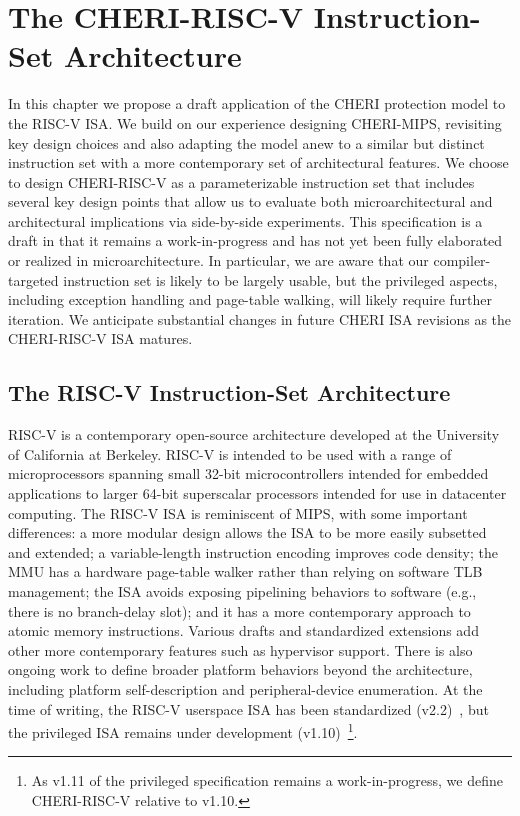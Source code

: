 \chapter{The CHERI-RISC-V Instruction-Set Architecture}
\label{chap:cheri-riscv}


\newcommand{\riscvloadcappagefault}{0x1A}
\newcommand{\riscvstorecappagefault}{0x1B}
\newcommand{\riscvcheriexception}{0x1C}

In this chapter we propose a draft application of the CHERI protection model
to the RISC-V ISA.
We build on our experience designing CHERI-MIPS, revisiting key design choices
and also adapting the model anew to a similar but distinct instruction set
with a more contemporary set of architectural features.
We choose to design CHERI-RISC-V as a parameterizable instruction set that
includes several key design points that allow us to evaluate both
microarchitectural and architectural implications via side-by-side
experiments.
This specification is a draft in that it remains a work-in-progress and has
not yet been fully elaborated or realized in microarchitecture.
In particular, we are aware that our compiler-targeted instruction set is
likely to be largely usable, but the privileged aspects, including exception
handling and page-table walking, will likely require further iteration.
We anticipate substantial changes in future CHERI ISA revisions as the
CHERI-RISC-V ISA matures.

\section{The RISC-V Instruction-Set Architecture}

RISC-V is a contemporary open-source architecture developed at the University
of California at Berkeley.
RISC-V is intended to be used with a range of microprocessors spanning small
32-bit microcontrollers intended for embedded applications to larger 64-bit
superscalar processors intended for use in datacenter computing.
The RISC-V ISA is reminiscent of MIPS, with some important differences: a more
modular design allows the ISA to be more easily subsetted and extended; a
variable-length instruction encoding improves code density; the MMU has a
hardware page-table walker rather than relying on software TLB management;
the ISA avoids exposing pipelining behaviors to software (e.g., there is no
branch-delay slot); and it has a more contemporary approach to atomic memory
instructions.
Various drafts and standardized extensions add other more contemporary
features such as hypervisor support.  There is also ongoing work to define
broader platform behaviors beyond the architecture, including platform
self-description and peripheral-device enumeration.
At the time of writing, the RISC-V userspace ISA has been standardized
(v2.2)~\cite{RISCV:User:2.2}, but the privileged ISA remains under
development (v1.10)~\cite{RISCV:Privileged:1.10}\footnote{As v1.11 of the
privileged specification remains a work-in-progress, we define CHERI-RISC-V
relative to v1.10.}. 

